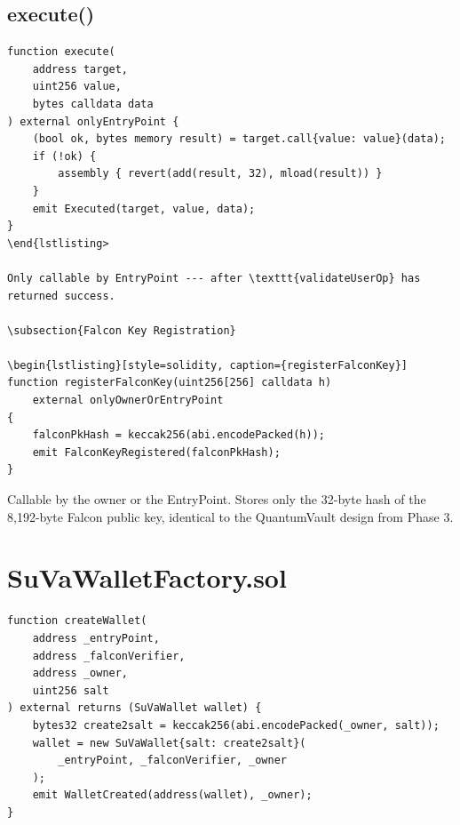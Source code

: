 \documentclass[11pt,a4paper]{article}
\begin{document}
\subsection{execute()}

\begin{lstlisting}[style=solidity, caption={execute --- runs the authorized call}]
function execute(
    address target,
    uint256 value,
    bytes calldata data
) external onlyEntryPoint {
    (bool ok, bytes memory result) = target.call{value: value}(data);
    if (!ok) {
        assembly { revert(add(result, 32), mload(result)) }
    }
    emit Executed(target, value, data);
}
\end{lstlisting>

Only callable by EntryPoint --- after \texttt{validateUserOp} has returned success.

\subsection{Falcon Key Registration}

\begin{lstlisting}[style=solidity, caption={registerFalconKey}]
function registerFalconKey(uint256[256] calldata h)
    external onlyOwnerOrEntryPoint
{
    falconPkHash = keccak256(abi.encodePacked(h));
    emit FalconKeyRegistered(falconPkHash);
}
\end{lstlisting}

Callable by the owner or the EntryPoint. Stores only the 32-byte hash of the 8,192-byte
Falcon public key, identical to the QuantumVault design from Phase 3.

\section{SuVaWalletFactory.sol}

\begin{lstlisting}[style=solidity, caption={Factory --- CREATE2 deterministic deployment}]
function createWallet(
    address _entryPoint,
    address _falconVerifier,
    address _owner,
    uint256 salt
) external returns (SuVaWallet wallet) {
    bytes32 create2salt = keccak256(abi.encodePacked(_owner, salt));
    wallet = new SuVaWallet{salt: create2salt}(
        _entryPoint, _falconVerifier, _owner
    );
    emit WalletCreated(address(wallet), _owner);
}
\end{lstlisting}
\end{document}
